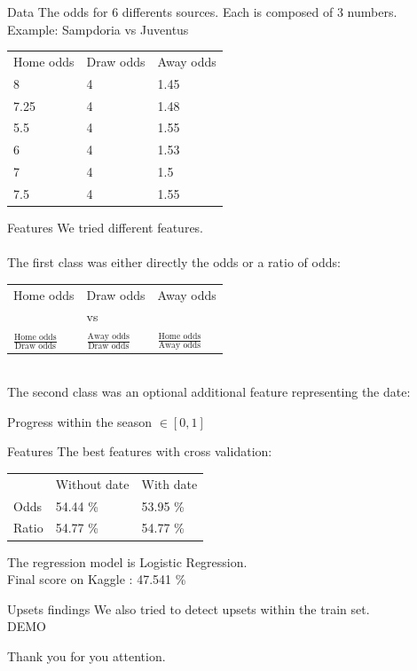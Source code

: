 \documentclass[french]{beamer}
\begin{document}
\begin{frame}{Data}
	The odds for 6 differents sources.
	Each is composed of 3 numbers.\\
	Example: Sampdoria vs Juventus\\
	\begin{center}
		\begin{tabular}{lll}
			Home odds & Draw odds & Away odds \\
			8 & 4 & 1.45\\
			7.25 & 4 & 1.48\\
			5.5 & 4 & 1.55\\
			6 & 4 & 1.53\\ 
			7 & 4 & 1.5\\ 
			7.5 & 4 & 1.55
		\end{tabular}	
	\end{center}
\end{frame}


\begin{frame}{Features}
	We tried different features.\\
	~\\
	The first class was either directly the odds or a ratio of odds:\\
	\begin{center}
		\begin{tabular}{lll}
			Home odds & Draw odds & Away odds \\
			  & vs & \\
			$\frac{\text{Home odds}}{\text{Draw odds}}$ & $\frac{\text{Away odds}}{\text{Draw odds}}$ & $\frac{\text{Home odds}}{\text{Away odds}}$\\
		\end{tabular}	
	\end{center}
	~\\
	The second class was an optional additional feature representing the date:\\
	\begin{center}
			Progress within the season $\in [0,1]$
	\end{center}
\end{frame}

\begin{frame}{Features}
	The best features with cross validation:
	\begin{center}
		\begin{tabular}{lll}
			 & Without date & With date\\
			 Odds & 54.44 \% & 53.95 \%\\
			 Ratio & 54.77 \% & 54.77 \%\\
		\end{tabular}	
	\end{center}
	The regression model is Logistic Regression.\\
	Final score on Kaggle : 47.541 \%
\end{frame}

\begin{frame}{Upsets findings}
	We also tried to detect upsets within the train set.\\
	DEMO \\
\end{frame}

\begin{frame}
	\begin{center}
		Thank you for you attention.
	\end{center}
\end{frame}
\end{document}
